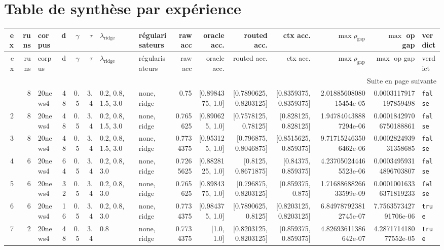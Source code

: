 \documentclass[11pt,a4paper]{article}
\begin{document}
\section*{Table de synthèse par expérience}
\begin{landscape}
\small
\begin{longtable}{r r l r r r l l r r r r r r l}
\toprule
ex & runs & corpus & d & $\gamma$ & $\tau$ & $\lambda_{\mathrm{ridge}}$ & régularisateurs & raw acc & oracle acc. & routed acc. & ctx acc. & $\max\rho_{\mathrm{gap}}$ & $\max$ op gap & verdict\\
\midrule
\endfirsthead
\toprule
ex & runs & corpus & d & $\gamma$ & $\tau$ & $\lambda_{\mathrm{ridge}}$ & régularisateurs & raw acc & oracle acc. & routed acc. & ctx acc. & $\max\rho_{\mathrm{gap}}$ & $\max$ op gap & verdict\\
\midrule
\endhead
\midrule
\multicolumn{15}{r}{Suite en page suivante}\\
\endfoot
\bottomrule
\endlastfoot
1 & 8 & 20news4 & 48 & 0.5 & 3.4 & 0.2, 0.8, 1.5, 3.0 & none, ridge & 0.75 & [0.8984375, 1.0] & [0.7890625, 0.8203125] & [0.8359375, 0.8359375] & 2.0188560808015454e-05 & 0.0003117917197859498 & \texttt{false} \\
2 & 8 & 20news4 & 48 & 0.5 & 3.4 & 0.2, 0.8, 1.5, 3.0 & none, ridge & 0.765625 & [0.890625, 1.0] & [0.7578125, 0.78125] & [0.828125, 0.828125] & 1.947840438887294e-06 & 0.00018429706750188861 & \texttt{false} \\
3 & 8 & 20news4 & 48 & 0.5 & 3.4 & 0.2, 0.8, 1.5, 3.0 & none, ridge & 0.7734375 & [0.953125, 1.0] & [0.796875, 0.8046875] & [0.8515625, 0.859375] & 9.717152463506462e-06 & 0.000282493931358685 & \texttt{false} \\
4 & 6 & 20news4 & 64 & 0.5 & 3.4 & 0.2, 0.8, 3.0 & none, ridge & 0.7265625 & [0.8828125, 1.0] & [0.8125, 0.8671875] & [0.84375, 0.859375] & 4.237050244465523e-06 & 0.00034959314896703807 & \texttt{false} \\
5 & 6 & 20news4 & 32 & 0.5 & 3.4 & 0.2, 0.8, 3.0 & none, ridge & 0.765625 & [0.8984375, 1.0] & [0.796875, 0.8203125] & [0.859375, 0.875] & 1.7168868826633599e-09 & 0.00010016336371819233 & \texttt{false} \\
6 & 6 & 20news4 & 16 & 0.5 & 3.4 & 0.2, 0.8, 3.0 & none, ridge & 0.7734375 & [0.984375, 1.0] & [0.7890625, 0.8125] & [0.8203125, 0.8203125] & 6.849787923812745e-07 & 7.756357342791706e-06 & \texttt{true} \\
7 & 2 & 20news4 & 48 & 0.5 & 3.4 & 0.8 & none, ridge & 0.7734375 & [1.0, 1.0] & [0.8203125, 0.8203125] & [0.859375, 0.859375] & 4.82693611386642e-07 & 4.287171418077552e-05 & \texttt{true} \\

\end{longtable}
\end{landscape}
\end{document}
